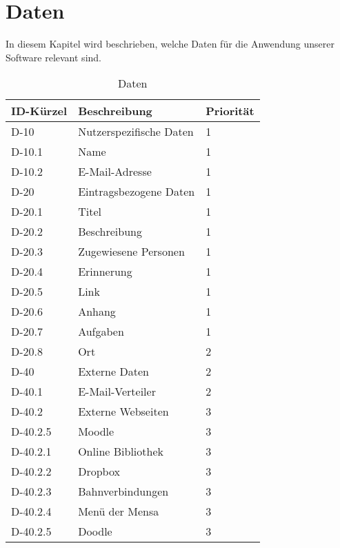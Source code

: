 
\chapter{Daten}

In diesem Kapitel wird beschrieben, welche Daten für die Anwendung unserer Software relevant sind.\\
\begin{longtable}{|l|p{5cm}|l|}
    \toprule
    \textbf{ID-Kürzel} & \textbf{Beschreibung} & \textbf{Priorität}\\
    \hline
    \endhead
    \hline
    \caption{Daten}
    \endfoot

    D-10 & Nutzerspezifische Daten & 1\\
    D-10.1 & Name &1\\
    D-10.2 & E-Mail-Adresse &1 \\       
    \hline
    D-20 & Eintragsbezogene Daten & 1\\
    D-20.1 & Titel &1\\
    D-20.2 & Beschreibung & 1\\
    D-20.3 & Zugewiesene Personen & 1\\
    D-20.4 & Erinnerung &1\\
    D-20.5 & Link &1\\
    D-20.6 & Anhang &1\\
    D-20.7 & Aufgaben & 1\\
    D-20.8 & Ort &  2\\
    \hline
    D-40 & Externe Daten & 2\\
    D-40.1 & E-Mail-Verteiler & 2\\
    D-40.2 & Externe Webseiten & 3 \\
    D-40.2.5 & Moodle & 3\\        
    D-40.2.1 & Online Bibliothek & 3\\
    D-40.2.2 & Dropbox & 3 \\
    D-40.2.3 & Bahnverbindungen & 3\\
    D-40.2.4 & Menü der Mensa & 3\\
    D-40.2.5 & Doodle & 3\\        
    \hline
\end{longtable}


